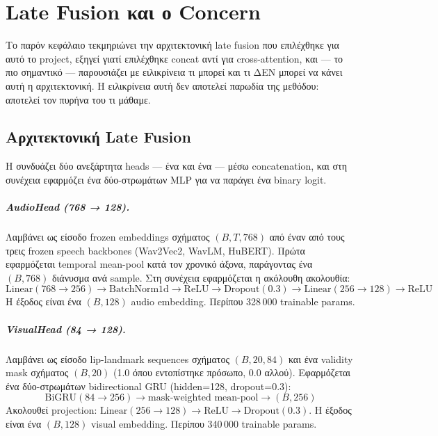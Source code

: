 \chapter{Late Fusion και ο Concern}
\label{chap:late-fusion-concern}

Το παρόν κεφάλαιο τεκμηριώνει την αρχιτεκτονική late fusion
που επιλέχθηκε για αυτό το project,
εξηγεί γιατί επιλέχθηκε concat αντί για cross-attention,
και — το πιο σημαντικό — παρουσιάζει με ειλικρίνεια
τι μπορεί και τι ΔΕΝ μπορεί να κάνει αυτή η αρχιτεκτονική.
Η ειλικρίνεια αυτή δεν αποτελεί παρωδία της μεθόδου:
αποτελεί τον πυρήνα του τι μάθαμε.

\section{Αρχιτεκτονική Late Fusion}
\label{sec:late-fusion-arch}

Η  συνδυάζει δύο ανεξάρτητα heads —
ένα  και ένα  —
μέσω concatenation, και στη συνέχεια εφαρμόζει
ένα δύο-στρωμάτων MLP για να παράγει ένα binary logit.

\paragraph{AudioHead (768 → 128).}
Λαμβάνει ως είσοδο frozen embeddings σχήματος $(B, T, 768)$
από έναν από τους τρεις frozen speech backbones
(Wav2Vec2, WavLM, HuBERT).
Πρώτα εφαρμόζεται temporal mean-pool κατά τον χρονικό άξονα,
παράγοντας ένα $(B, 768)$ διάνυσμα ανά sample.
Στη συνέχεια εφαρμόζεται η ακόλουθη ακολουθία:
\[
  \text{Linear}(768 \to 256) \to \text{BatchNorm1d} \to \text{ReLU}
  \to \text{Dropout}(0.3) \to \text{Linear}(256 \to 128) \to \text{ReLU}
\]
Η έξοδος είναι ένα $(B, 128)$ audio embedding.
Περίπου 328\,000 trainable params.

\paragraph{VisualHead (84 → 128).}
Λαμβάνει ως είσοδο lip-landmark sequences σχήματος $(B, 20, 84)$
και ένα validity mask σχήματος $(B, 20)$
(1.0 όπου εντοπίστηκε πρόσωπο, 0.0 αλλού).
Εφαρμόζεται ένα δύο-στρωμάτων bidirectional GRU
(hidden=128, dropout=0.3):
\[
  \text{BiGRU}(84 \to 256) \to \text{mask-weighted mean-pool} \to (B, 256)
\]
Ακολουθεί projection:
$\text{Linear}(256 \to 128) \to \text{ReLU} \to \text{Dropout}(0.3)$.
Η έξοδος είναι ένα $(B, 128)$ visual embedding.
Περίπου 340\,000 trainable params.

